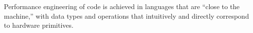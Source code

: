 Performance engineering of code is achieved in languages that are ``close to the machine,'' with data types and operations that intuitively and directly correspond to hardware primitives.\cite{Ritchie}

